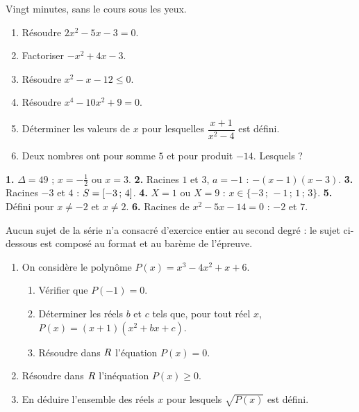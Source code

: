 \begin{jemeteste}
Vingt minutes, sans le cours sous les yeux.

\begin{enumerate}[label=\textbf{\arabic*.}, leftmargin=*, itemsep=0.3em]
  \item Résoudre $2x^{2}-5x-3 = 0$.
  \item Factoriser $-x^{2}+4x-3$.
  \item Résoudre $x^{2}-x-12 \leq 0$.
  \item Résoudre $x^{4}-10x^{2}+9 = 0$.
  \item Déterminer les valeurs de $x$ pour lesquelles $\dfrac{x+1}{x^{2}-4}$
        est défini.
  \item Deux nombres ont pour somme $5$ et pour produit $-14$. Lesquels ?
\end{enumerate}
\end{jemeteste}

\begin{corrige}[je me teste]
\textbf{1.} $\Delta = 49$ ; $x = -\frac12$ ou $x = 3$.
\textbf{2.} Racines $1$ et $3$, $a = -1$ : $-(x-1)(x-3)$.
\textbf{3.} Racines $-3$ et $4$ : $S = \left[-3\,;\,4\right]$.
\textbf{4.} $X = 1$ ou $X = 9$ : $x \in \{-3\,;\,-1\,;\,1\,;\,3\}$.
\textbf{5.} Défini pour $x \neq -2$ et $x \neq 2$.
\textbf{6.} Racines de $x^{2}-5x-14 = 0$ : $-2$ et $7$.
\end{corrige}

\begin{commeaubac}
Aucun sujet de la série n'a consacré d'exercice entier au second degré : le
sujet ci-dessous est composé au format et au barème de l'épreuve.

\begin{enumerate}[label=\textbf{\arabic*.}, leftmargin=*, itemsep=0.28em]
  \item On considère le polynôme $P(x) = x^{3}-4x^{2}+x+6$.
    \begin{enumerate}[label=\textbf{\alph*)}, leftmargin=1.4em, itemsep=0.15em]
      \item Vérifier que $P(-1) = 0$. 
      \item Déterminer les réels $b$ et $c$ tels que, pour tout réel $x$,
            $P(x) = (x+1)\left(x^{2}+bx+c\right)$. 
      \item Résoudre dans $R$ l'équation $P(x) = 0$. \bareme{1 pt}
    \end{enumerate}
  \item Résoudre dans $R$ l'inéquation $P(x) \geq 0$. 
  \item En déduire l'ensemble des réels $x$ pour lesquels $\sqrt{P(x)}$ est
        défini. 
\end{enumerate}
\end{commeaubac}

